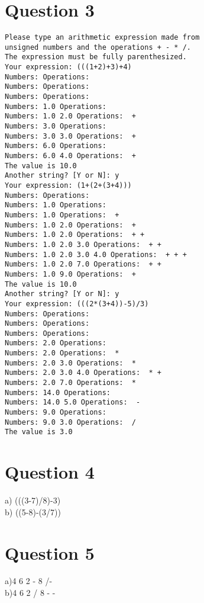 \documentclass[12pt]{article} %
\begin{document}
\section{Question 3} 
\begin{lstlisting}
Please type an arithmetic expression made from
unsigned numbers and the operations + - * /.
The expression must be fully parenthesized.
Your expression: (((1+2)+3)+4)
Numbers: Operations:
Numbers: Operations:
Numbers: Operations:
Numbers: 1.0 Operations:
Numbers: 1.0 2.0 Operations:  +
Numbers: 3.0 Operations:
Numbers: 3.0 3.0 Operations:  +
Numbers: 6.0 Operations:
Numbers: 6.0 4.0 Operations:  +
The value is 10.0
Another string? [Y or N]: y
Your expression: (1+(2+(3+4)))
Numbers: Operations:
Numbers: 1.0 Operations:
Numbers: 1.0 Operations:  +
Numbers: 1.0 2.0 Operations:  +
Numbers: 1.0 2.0 Operations:  + +
Numbers: 1.0 2.0 3.0 Operations:  + +
Numbers: 1.0 2.0 3.0 4.0 Operations:  + + +
Numbers: 1.0 2.0 7.0 Operations:  + +
Numbers: 1.0 9.0 Operations:  +
The value is 10.0
Another string? [Y or N]: y
Your expression: (((2*(3+4))-5)/3)
Numbers: Operations:
Numbers: Operations:
Numbers: Operations:
Numbers: 2.0 Operations:
Numbers: 2.0 Operations:  *
Numbers: 2.0 3.0 Operations:  *
Numbers: 2.0 3.0 4.0 Operations:  * +
Numbers: 2.0 7.0 Operations:  *
Numbers: 14.0 Operations:
Numbers: 14.0 5.0 Operations:  -
Numbers: 9.0 Operations:
Numbers: 9.0 3.0 Operations:  /
The value is 3.0
\end{lstlisting}

\section{Question 4}
a) (((3-7)/8)-3) \\
b) ((5-8)-(3/7))
\section{Question 5}
a)4 6 2 - 8 /- \\
b)4 6 2 / 8 - -
\end{document}
